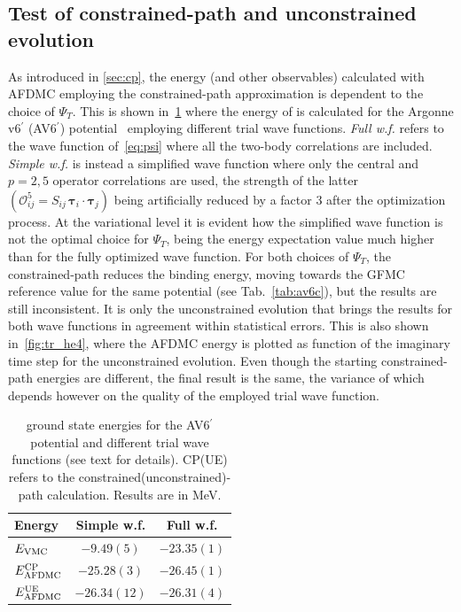 \documentclass[aps,prc,twocolumn,superscriptaddress,floatfix]{revtex4-1}
\begin{document}
\subsection{Test of constrained-path and unconstrained evolution}
\label{sec:res_cp}
As introduced in \cref{sec:cp}, the energy (and other observables) calculated with AFDMC
employing the constrained-path approximation is dependent to the choice of $\Psi_T$.
This is shown in~\cref{tab:tr} where the energy of  
is calculated for the Argonne v6$^\prime$ (AV6$^\prime$) potential~\cite{Wiringa:2002} 
employing different trial wave functions. 
\textit{Full w.f.} refers to the wave function of~\cref{eq:psi} where all the two-body 
correlations are included.
\textit{Simple w.f.} is instead a simplified wave function where only the central and
$p=2,5$ operator correlations are used, the strength of the latter 
$(\mathcal O_{ij}^5=S_{ij}\,\bm\tau_i\cdot\bm\tau_j)$ being artificially reduced by 
a factor 3 after the optimization process. At the variational level it is evident how
the simplified wave function is not the optimal choice for $\Psi_T$, being the energy
expectation value much higher than for the fully optimized wave function. For both choices
of $\Psi_T$, the constrained-path reduces the binding energy, moving towards the
GFMC reference value for the same potential (see Tab.~\ref{tab:av6c}), but the results are still inconsistent.
It is only the unconstrained evolution that brings the results for both wave functions 
in agreement within statistical errors. This is also shown in~\cref{fig:tr_he4}, where the 
AFDMC energy is plotted as function of the imaginary time step for the unconstrained evolution. 
Even though the starting constrained-path energies are different, the final result is the same, the 
variance of which depends however on the quality of the employed trial wave function. 

\setlength{\tabcolsep}{8pt}
\begin{table}[htb]
\centering
\caption[]{ ground state energies for the AV6$^\prime$ potential and different 
trial wave functions (see text for details). 
CP(UE) refers to the constrained(unconstrained)-path calculation.
Results are in MeV.}
\begin{tabular}{lcc}
\hline\hline
Energy & Simple w.f. & Full w.f. \\
\hline
$E_{\rm VMC}$            & $-9.49(5)$   & $-23.35(1)$ \\
$E_{\rm AFDMC}^{\rm CP}$ & $-25.28(3)$  & $-26.45(1)$ \\
$E_{\rm AFDMC}^{\rm UE}$ & $-26.34(12)$ & $-26.31(4)$ \\
\hline\hline
\end{tabular}
\label{tab:tr}
\end{table}
\setlength{\tabcolsep}{8pt}
\end{document}
